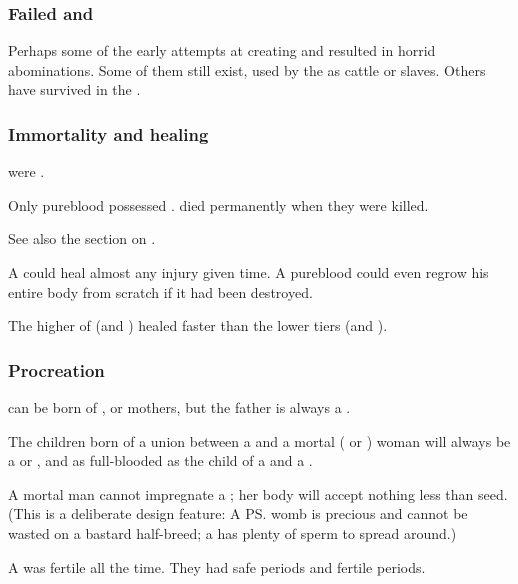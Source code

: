 \subsubsection{Failed \resphain{} and \humans}
Perhaps some of the early attempts at creating \resphain{} and \humans{} resulted in horrid abominations. 
Some of them still exist, used by the \resphain{} as cattle or slaves. 
Others have survived in the . 





\subsubsection{Immortality and healing}
\Resphain were .

Only pureblood \resphain possessed .
\Ashenbloods died permanently when they were killed.

See also the section on . 

A \resphan could heal almost any injury given time. 
A pureblood could even regrow his entire body from scratch if it had been destroyed. 

The higher  of \resphain (\satharioth and \ketherain) healed faster than the lower tiers (\thelyadeth and \bezedeth). 






\subsubsection{Procreation}
\Resphain{} can be born of \resvil{}, \human{} or \nephilic{} mothers, but the father is always a \resphan. 

The children born of a union between a \resphan{} and a mortal (\human{} or \nephil) woman will always be a \resphan{} or \resvil, and as full-blooded as the child of a \resphan{} and a \resvil. 

A mortal man cannot impregnate a \resvil; her body will accept nothing less than \resphan{} seed. 
(This is a deliberate design feature: A \ps{\resvil}{} womb is precious and cannot be wasted on a bastard half-breed; a \resphan{} has plenty of sperm to spread around.)

A \resvil was fertile all the time.
They had safe periods and fertile periods. 

